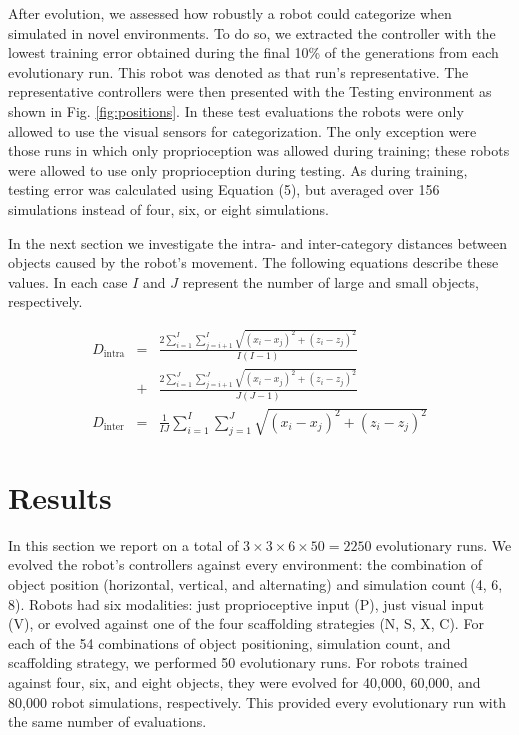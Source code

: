\documentclass{sig-alternate}
\begin{document}
After evolution, we assessed how robustly a robot could categorize when simulated in novel environments.
To do so, we extracted the controller with the lowest training error obtained during the final 10\% of the generations from each evolutionary run. This robot was denoted as that run's representative. 
The representative controllers were then presented with the Testing environment as shown in Fig. \ref{fig:positions}.
In these test evaluations the robots were only allowed to use the visual sensors for categorization. The only exception were those runs in which only proprioception was allowed during training; these robots were allowed to use only proprioception during testing.
As during training, testing error was calculated using Equation (5), but averaged over 156 simulations instead of four, six, or eight simulations.

In the next section we investigate the intra- and inter-category distances
between objects caused by the robot's movement. The following equations describe these values. In each case $I$ and $J$ represent the number of large and small objects, respectively. 

\begin {eqnarray}
  D_{\text{intra}} &=& \frac{2 \sum_{i=1}^{I} \sum_{j=i + 1}^{I} \sqrt{(x_i - x_j)^2 + (z_i - z_j)^2} }{I (I - 1)} \\
  &+& \frac{2 \sum_{i=1}^{J} \sum_{j=i + 1}^{J} \sqrt{(x_i - x_j)^2 + (z_i - z_j)^2} }{J (J - 1)} \nonumber \\
  D_{\text{inter}} &=& \frac{1}{I J} \sum_{i=1}^{I} \sum_{j=1}^{J} \sqrt{(x_i - x_j)^2 + (z_i - z_j)^2} 
\end {eqnarray}

\section {Results}
\label{sectResults}

In this section we report on a total of $3 \times 3 \times 6 \times 50 = 2250$ evolutionary runs. We evolved the robot's controllers against every environment: the combination of object position (horizontal, vertical, and alternating) and simulation count (4, 6, 8). Robots had six modalities: just proprioceptive input (P), just visual input (V), or evolved against one of the four scaffolding strategies (N, S, X, C). For each of the 54 combinations of object positioning, simulation count, and scaffolding strategy, we performed 50
evolutionary runs. For robots trained against four, six, and eight objects, they were evolved for 40,000, 60,000, and 80,000 robot simulations, respectively. This provided every evolutionary run with the same number of evaluations. 
\end{document}

